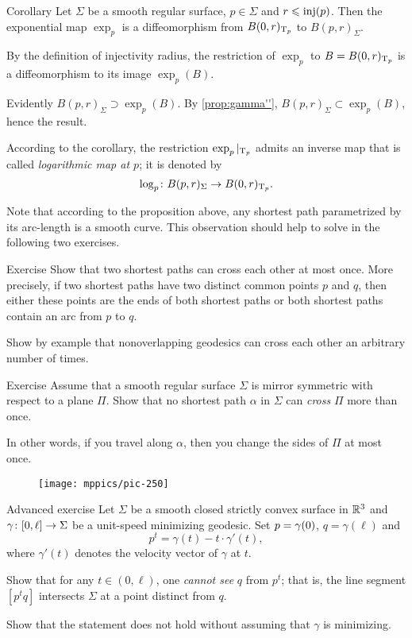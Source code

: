 \begin{thm}{Corollary}
Let $\Sigma$ be a smooth regular surface, $p\in\Sigma$ and $r\z\le \inj(p)$.
Then  the exponential map $\exp_p$ is a diffeomorphism from $B(0,r)_{\mathrm{T}_p}$ to $B(p,r)_\Sigma$.
\end{thm}

By the definition of injectivity radius, the restriction of $\exp_p$ to $B={B(0,r)_{\mathrm{T}_p}}$ is a diffeomorphism to its image $\exp_p(B)$.

Evidently $B(p,r)_\Sigma\supset\exp_p(B)$.
By \ref{prop:gamma''}, $B(p,r)_\Sigma\subset\exp_p(B)$, hence the result.
\qeds

According to the corollary, the restriction $\exp_p|_{\mathrm{T}_p}$ admits an inverse map that is called \emph{logarithmic map at $p$};
it is denoted by \[\log_p\colon B(p,r)_\Sigma\to B(0,r)_{\mathrm{T}_p}.\]

Note that according to the proposition above, any shortest path parametrized by its arc-length is a smooth curve.
This observation should help to solve in the following two exercises.


\begin{thm}{Exercise}\label{ex:two-min-geod}
Show that two shortest paths can cross each other at most once.
More precisely, if two shortest paths have two distinct common points $p$ and $q$, then either these points are the ends of both shortest paths or both shortest paths contain an arc from $p$ to $q$.

Show by example that nonoverlapping geodesics can cross each other an arbitrary number of times.
\end{thm}

\begin{thm}{Exercise}\label{ex:min-geod+plane}
Assume that a smooth regular surface $\Sigma$ is mirror symmetric with respect to a plane $\Pi$.
Show that no shortest path $\alpha$ in $\Sigma$ can {}\emph{cross} $\Pi$ more than once.


In other words, if you travel along $\alpha$, then you change the sides of $\Pi$ at most once. 
\end{thm}

{

\begin{wrapfigure}{r}{40 mm}
\vskip-8mm
\centering
\texttt{[image: mppics/pic-250]}
\vskip-0mm
\end{wrapfigure}

\begin{thm}{Advanced exercise}\label{ex:milka}
Let $\Sigma$ be a smooth closed strictly convex surface 
in $\mathbb{R}^3$ 
and $\gamma\:[0,\ell]\z\to \Sigma$ be a unit-speed minimizing geodesic.
Set $p\z=\gamma(0)$, $q=\gamma(\ell)$ and 
$$p^t=\gamma(t)-t\cdot\gamma'(t),$$ 
where $\gamma'(t)$ denotes the velocity vector of $\gamma$ at $t$.

Show that for any $t\in (0,\ell)$,
one {}\emph{cannot see}  $q$ from $p^t$;
that is, the line segment $[p^tq]$ intersects $\Sigma$ at a point distinct from $q$.

Show that the statement does not hold without assuming that $\gamma$ is minimizing.
\end{thm}

}


